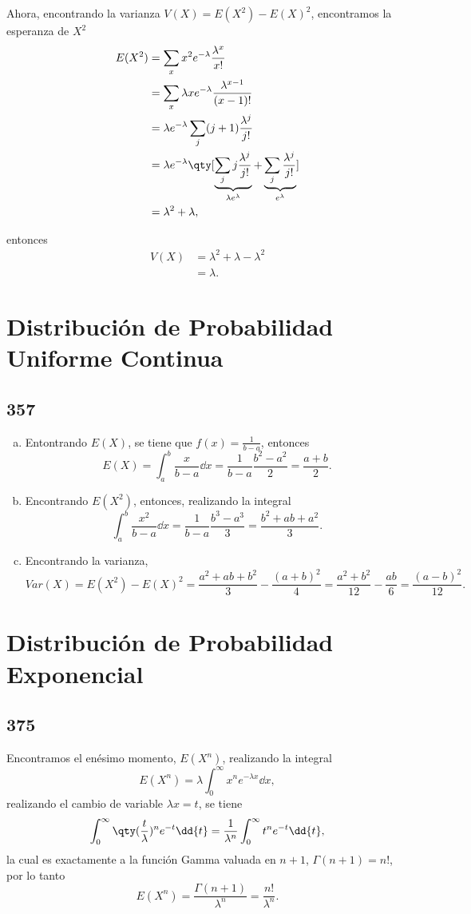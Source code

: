 Ahora, encontrando la varianza $V(X) = E(X^2) - E(X)^2$, encontramos la esperanza de $X^2$
	\begin{align*}
		E(X^2) &= \sum _x x^2 e^{-\lambda} \frac{\lambda ^x}{x!} \\
		&= \sum _x \lambda xe^{-\lambda} \frac{\lambda ^{x - 1}}{(x - 1)!} \\
		&= \lambda e^{-\lambda} \sum _j (j + 1) \frac{\lambda ^j}{j!} \\
		&= \lambda e^{-\lambda} \qty[\underbrace{\sum _j j\frac{\lambda ^j}{j!}}_{\lambda e^\lambda} + \underbrace{\sum _j \frac{\lambda ^j}{j!}}_{e^\lambda}] \\
		&= \lambda ^2 + \lambda ,
	\end{align*}

entonces
\begin{align*}
	V(X) &= \lambda ^2 + \lambda - \lambda ^2 \\
	&= \lambda .
\end{align*}



\section{Distribución de Probabilidad Uniforme Continua}
\subsection*{357}

\begin{enumerate}[a)]
	\item Entontrando $E(X)$, se tiene que $f(x) = \frac{1}{b-a}$, entonces
		$$E(X) = \int _a ^b \frac{x}{b-a} \dd{x} = \frac{1}{b-a} \frac{b^2 - a^2}{2} = \frac{a+b}{2}.$$
	\item Encontrando $E(X^2)$, entonces, realizando la integral
		$$\int _a ^b \frac{x^2}{b-a} \dd{x} = \frac{1}{b-a} \frac{b^3 - a^3}{3} = \frac{b^2 + ab + a^2}{3}.$$
	\item Encontrando la varianza,
		$$Var(X) = E(X^2) - E(X)^2 = \frac{a^2 + ab + b^2}{3} - \frac{(a + b)^2}{4} = \frac{a^2 + b^2}{12} - \frac{ab}{6} = \frac{(a - b)^2}{12}.$$
\end{enumerate}


\section{Distribución de Probabilidad Exponencial}
\subsection*{375}
Encontramos el enésimo momento, $E(X^n)$, realizando la integral
	$$E(X^n) = \lambda \int _0 ^\infty x^n e^{-\lambda x} \dd{x},$$
realizando el cambio de variable $\lambda x = t$, se tiene
	$$\int _0 ^\infty \qty(\frac{t}{\lambda})^n e^{-t} \dd{t} = \frac{1}{\lambda ^n} \int _0 ^\infty t^n e^{-t} \dd{t},$$
la cual es exactamente a la función Gamma valuada en $n+1$, $\Gamma (n+1) = n!$, por lo tanto
	$$E(X^n) = \frac{\Gamma (n+1)}{\lambda ^n} = \frac{n!}{\lambda ^n}.$$


